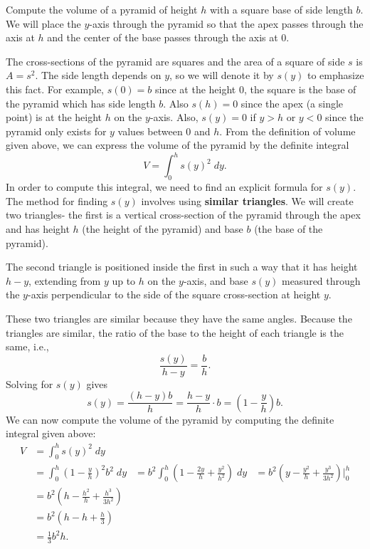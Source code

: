 \documentclass{ximera}
\begin{document}



\begin{example}[example 1] Compute the volume of a pyramid of height $h$ with a square base of side length $b$.\\
We will place the $y$-axis through the pyramid so that the apex passes through the axis at $h$ and the center of the base passes through 
the axis at $0$.

\begin{center}
\end{center}


The cross-sections of the pyramid are squares and the area of a square of side $s$ is $A = s^2$.
The side length depends on $y$, so we will denote it by $s(y)$ to emphasize this fact. For example, $s(0) = b$ since at the height $0$, the square is 
the base of the pyramid which has side length $b$. Also $s(h) = 0$ since the apex (a single point) is at the height $h$ on the $y$-axis.
Also, $s(y) = 0$ if $y>h$ or $y<0$ since the pyramid only exists for $y$ values between $0$ and $h$.
From the definition of volume given above, we can express the volume of the pyramid by the definite integral 
\[
V = \int_0^h s(y)^2 \; dy.
\]
In order to compute this integral, we need to find an explicit formula for $s(y)$.
The method for finding $s(y)$ involves using \textbf{similar triangles}. We will create two triangles- 
the first is a vertical cross-section of the pyramid through the apex and has height $h$ (the height of the pyramid) 
and base $b$ (the base of the pyramid). 


The second triangle is positioned inside the first in such a way that it has height $h-y$, extending from $y$ up to $h$ on the $y$-axis,
and base $s(y)$ measured through the $y$-axis perpendicular to the side of the square cross-section at height $y$.


These two triangles are similar because they have the same angles. Because the triangles are similar, the ratio of the base to 
the height of each triangle is the same, 
i.e.,
\[
\frac{s(y)}{h-y} = \frac{b}{h}.
\]
 Solving for $s(y)$ gives
 \[
 s(y) = \frac{(h-y)b}{h} = \frac{h-y}{h} \cdot b = \left(1-\frac{y}{h}\right)b.
 \]
 We can now compute the volume of the pyramid by computing the definite integral given above:
 \begin{align*}
 V &= \int_0^h s(y)^2 \; dy\\
   &= \int_0^h \left(1-\frac{y}{h}\right)^2b^2 \; dy
   &= b^2 \int_0^h \left(1 - \frac{2y}{h} + \frac{y^2}{h^2}\right)\; dy
   &= b^2 \left(y - \frac{y^2}{h} + \frac{y^3}{3h^2}\right)\bigg|_0^h\\
   &= b^2 \left(h - \frac{h^2}{h} + \frac{h^3}{3h^2}\right)\\
   &= b^2 \left(h - h + \frac{h}{3}\right)\\
   &= \frac13 b^2h.
\end{align*}



\end{example}
 
\end{document}
